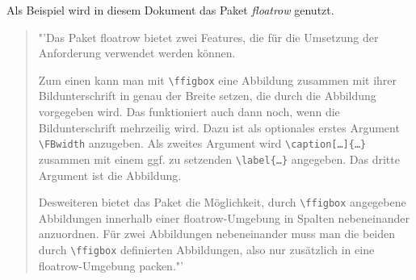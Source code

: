 Als Beispiel wird in diesem Dokument das Paket \emph{floatrow} genutzt.
\begin{quote}
	"'Das Paket floatrow bietet zwei Features, die für die Umsetzung der Anforderung verwendet werden können.
	
	Zum einen kann man mit \verb|\ffigbox| eine Abbildung zusammen mit ihrer Bildunterschrift in genau der Breite setzen, die durch die Abbildung vorgegeben wird. Das funktioniert auch dann noch, wenn die Bildunterschrift mehrzeilig wird. Dazu ist als optionales erstes Argument \verb|\FBwidth| anzugeben. Als zweites Argument wird \verb|\caption[…]{…}| zusammen mit einem ggf. zu setzenden \verb|\label{…}| angegeben. Das dritte Argument ist die Abbildung.
	
	Desweiteren bietet das Paket die Möglichkeit, durch \verb|\ffigbox| angegebene Abbildungen innerhalb einer floatrow-Umgebung in Spalten nebeneinander anzuordnen. Für zwei Abbildungen nebeneinander muss man die beiden durch \verb|\ffigbox| definierten Abbildungen, also nur zusätzlich in eine floatrow-Umgebung packen."'\autocite{floatrow}
\end{quote}
\begin{figure}[h]
	\centering
	\begin{floatrow}
	\end{floatrow}
\end{figure}

